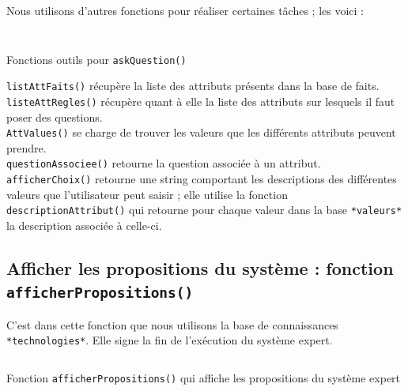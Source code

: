 \documentclass[a4paper,12pt]{article}
\begin{document}
Nous utilisons d'autres fonctions pour réaliser certaines tâches ; les voici : 

\begin{listing}[H]
	\centering
	\inputminted[breaklines=true,linenos, firstline = 24,lastline = 71]{lisp}{../askQuestion.lisp}
\end{listing}

\begin{listing}[H]
	\centering
	\inputminted[breaklines=true,linenos, firstline = 73]{lisp}{../askQuestion.lisp}
	\caption{Fonctions outils pour \texttt{askQuestion()}}
\end{listing}

\texttt{listAttFaits()} récupère la liste des attributs présents dans la base de faits.\\

\texttt{listeAttRegles()} récupère quant à elle la liste des attributs sur lesquels il faut poser des questions.\\

\texttt{AttValues()} se charge de trouver les valeurs que les différents attributs peuvent prendre.\\

\texttt{questionAssociee()} retourne la question associée à un attribut.
\texttt{afficherChoix()} retourne une string comportant les descriptions des différentes valeurs que l'utilisateur peut saisir ; elle utilise la fonction
\texttt{descriptionAttribut()} qui retourne pour chaque valeur dans la base \texttt{*valeurs*} la description associée à celle-ci.



\subsection{Afficher les propositions du système : fonction \texttt{afficherPropositions()}}

	C'est dans cette fonction que nous utilisons la base de connaissances \texttt{*technologies*}. Elle signe la fin de l'exécution du système expert.

\begin{listing}[H]
	\centering
	\inputminted[breaklines=true,linenos,lastline=9]{lisp}{../afficherPropositions.lisp}
	\caption{Fonction \texttt{afficherPropositions()} qui affiche les propositions du système expert}
\end{listing}
\end{document}
